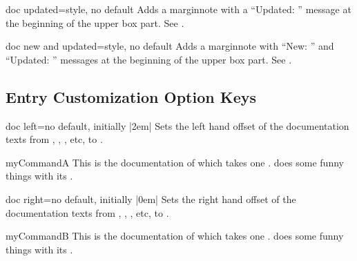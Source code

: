 \begin{docTcbKey}[][doc new=2014-09-19]{doc updated}{=}{style, no default}
  Adds a marginnote with a \enquote{Updated: } message at the beginning of
  the upper box part. See .
\end{docTcbKey}


\begin{docTcbKey}[][doc new=2014-09-19]{doc new and updated}{=}{style, no default}
  Adds a marginnote with \enquote{New: } and \enquote{Updated: } messages at the beginning of
  the upper box part. See .
\end{docTcbKey}



\clearpage
\subsection{Entry Customization Option Keys}


\begin{docTcbKey}{doc left}{=}{no default, initially |2em|}
  Sets the left hand offset of the documentation texts from
  , , , etc, to .
\begin{dispExample}
\begin{docCommand*}[doc left=2cm,doc left indent=-2cm]{myCommandA}{}
  This is the documentation of  which takes one .
   does some funny things with its .
\end{docCommand*}
\end{dispExample}
\end{docTcbKey}

\begin{docTcbKey}{doc right}{=}{no default, initially |0em|}
  Sets the right hand offset of the documentation texts from
  , , , etc, to .
\begin{dispExample}
\begin{docCommand*}[doc right=2cm]{myCommandB}{}
  This is the documentation of  which takes one .
   does some funny things with its .
\end{docCommand*}
\end{dispExample}
\end{docTcbKey}

